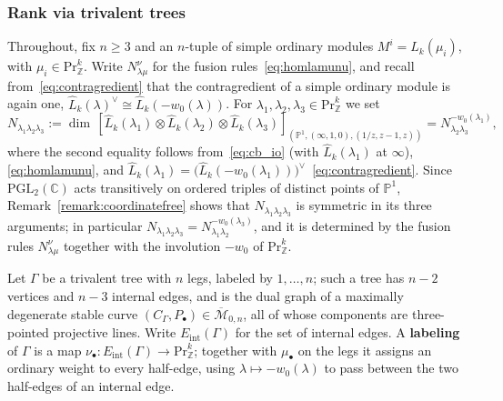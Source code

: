 \documentclass[12pt,a4paper,reqno]{amsart}
\numberwithin{equation}{section}
\theoremstyle{definition}
\newcommand{\C}{\mathbb{C}}
\newcommand{\Z}{\mathbb{Z}}
\renewcommand{\P}{\mathbb{P}}
\newcommand{\M}{\mathcal{M}}
\def\Pr{\mathrm{Pr}}
\def\la{\lambda}
\def\o{\otimes}
\def\ra{\rightarrow}
\def\ds{\dots}
\begin{document}
\subsubsection{Rank via trivalent trees}\label{subsubsec:rank}

Throughout, fix $n\geq 3$ and an $n$-tuple of simple ordinary modules $M^i=\hat{L}_k(\mu_i)$, with $\mu_i\in \Pr^k_\Z$. Write $N_{\la\mu}^\nu$ for the fusion rules~\eqref{eq:homlamunu}, and recall from~\eqref{eq:contragredient} that the contragredient of a simple ordinary module is again one, $\hat{L}_k(\la)^\vee\cong \hat{L}_k(-w_0(\la))$. For $\la_1,\la_2,\la_3\in \Pr^k_\Z$ we set
\begin{equation}\label{eq:threepoint}
N_{\la_1\la_2\la_3}:=\dim\,[\hat{L}_k(\la_1)\o\hat{L}_k(\la_2)\o\hat{L}_k(\la_3)]_{(\P^1,(\infty,1,0),(1/z,z-1,z))}=N_{\la_2\la_3}^{-w_0(\la_1)},
\end{equation}
where the second equality follows from~\eqref{eq:cb_io} (with $\hat{L}_k(\la_1)$ at $\infty$), \eqref{eq:homlamunu}, and $\hat{L}_k(\la_1)=\big(\hat{L}_k(-w_0(\la_1))\big)^\vee$~\eqref{eq:contragredient}. Since $\mathrm{PGL}_2(\C)$ acts transitively on ordered triples of distinct points of $\P^1$, Remark~\ref{remark:coordinatefree} shows that $N_{\la_1\la_2\la_3}$ is symmetric in its three arguments; in particular $N_{\la_1\la_2\la_3}=N_{\la_1\la_2}^{-w_0(\la_3)}$, and it is determined by the fusion rules $N_{\la\mu}^\nu$ together with the involution $-w_0$ of $\Pr^k_\Z$.

Let $\Gamma$ be a trivalent tree with $n$ legs, labeled by $1,\ds,n$; such a tree has $n-2$ vertices and $n-3$ internal edges, and is the dual graph of a maximally degenerate stable curve $(C_\Gamma,P_\bullet)\in \overline{\M}_{0,n}$, all of whose components are three-pointed projective lines. Write $E_{\mathrm{int}}(\Gamma)$ for the set of internal edges. A \textbf{labeling} of $\Gamma$ is a map $\nu_\bullet:E_{\mathrm{int}}(\Gamma)\ra \Pr^k_\Z$; together with $\mu_\bullet$ on the legs it assigns an ordinary weight to every half-edge, using $\la\mapsto -w_0(\la)$ to pass between the two half-edges of an internal edge.
\end{document}
